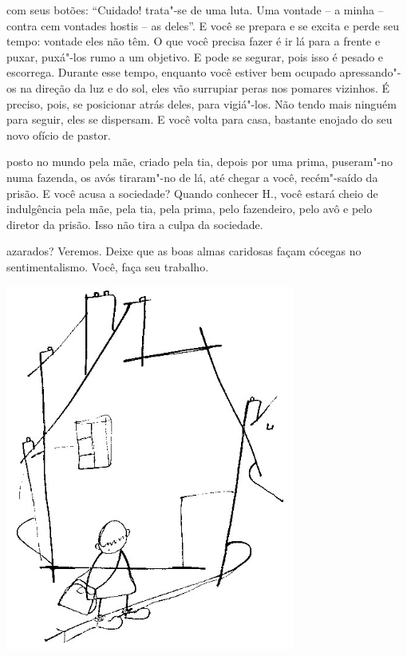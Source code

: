 
\pagebreak

 com seus botões: ``Cuidado! trata"-se de uma luta. Uma vontade -- a
minha -- contra cem vontades hostis -- as deles''. E você se prepara e
se excita e perde seu tempo: vontade eles não têm. O que você precisa
fazer é ir lá para a frente e puxar, puxá"-los rumo a um objetivo. E pode
se segurar, pois isso é pesado e escorrega. Durante esse tempo, enquanto
você estiver bem ocupado apressando"-os na direção da luz e do sol, eles
vão surrupiar peras nos pomares vizinhos. É preciso, pois, se posicionar
atrás deles, para vigiá"-los. Não tendo mais ninguém para seguir, eles se
dispersam. E você volta para casa, bastante enojado do seu novo ofício
de pastor.



 posto no mundo pela mãe, criado pela tia, depois por uma prima,
puseram"-no numa fazenda, os avós tiraram"-no de lá, até chegar a você,
recém"-saído da prisão. E você acusa a sociedade? Quando conhecer H.,
você estará cheio de indulgência pela mãe, pela tia, pela prima, pelo
fazendeiro, pelo avô e pelo diretor da prisão. Isso não tira a culpa da
sociedade.



 azarados? Veremos. Deixe que as boas almas caridosas façam
cócegas no sentimentalismo. Você, faça seu trabalho.


\pagebreak
\thispagestyle{empty}

\begin{vplace}[.50]
\begin{center}
\includegraphics[width=95mm]{./imgs/Image_3.jpg}
\end{center}
\end{vplace}

